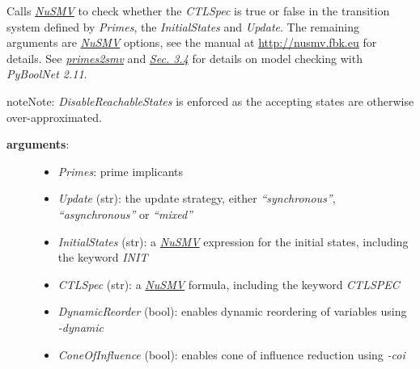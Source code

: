\documentclass[letterpaper,10pt,english]{sphinxmanual}
\begin{document}
\begin{fulllineitems}
\label{ModelChecking:PyBoolNet.ModelChecking.check_primes_with_acceptingstates}
Calls {\hyperref[Installation:installation-nusmv]{\emph{NuSMV}}} to check whether the \emph{CTLSpec} is true or false in the transition system defined by \emph{Primes},
the \emph{InitialStates} and \emph{Update}.
The remaining arguments are {\hyperref[Installation:installation-nusmv]{\emph{NuSMV}}} options, see the manual at \href{http://nusmv.fbk.eu}{http://nusmv.fbk.eu} for details.
See {\hyperref[ModelChecking:primes2smv]{\emph{primes2smv}}} and {\hyperref[Manual:sec-model-checking]{\emph{Sec. 3.4}}} for details on model checking with \emph{PyBoolNet 2.11}.

\begin{notice}{note}{Note:}
\emph{DisableReachableStates} is enforced as the accepting states are otherwise over-approximated.
\end{notice}
\begin{description}
\item[{\textbf{arguments}:}] \leavevmode\begin{itemize}
\item {} 
\emph{Primes}: prime implicants

\item {} 
\emph{Update} (str): the update strategy, either \emph{``synchronous''}, \emph{``asynchronous''} or \emph{``mixed''}

\item {} 
\emph{InitialStates} (str): a {\hyperref[Installation:installation-nusmv]{\emph{NuSMV}}} expression for the initial states, including the keyword \emph{INIT}

\item {} 
\emph{CTLSpec} (str): a {\hyperref[Installation:installation-nusmv]{\emph{NuSMV}}} formula, including the keyword \emph{CTLSPEC}

\item {} 
\emph{DynamicReorder} (bool): enables dynamic reordering of variables using \emph{-dynamic}

\item {} 
\emph{ConeOfInfluence} (bool): enables cone of influence reduction using \emph{-coi}

\end{itemize}


\end{description}
\end{fulllineitems}
\end{document}
